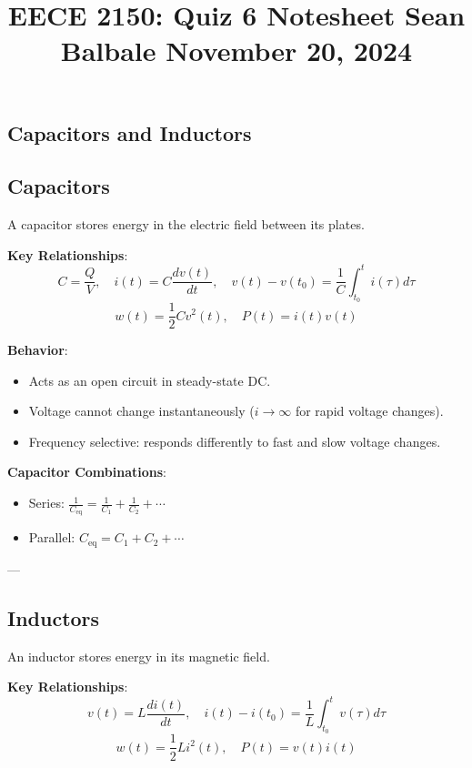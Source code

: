 \documentclass[9pt]{article}
\title{
    \vspace{-2em}
    \large EECE 2150: Quiz 6 Notesheet \hfill Sean Balbale \hfill November 20, 2024
    \vspace{-4em}
}
\date{}
\begin{document}
\maketitle

\begin{multicols}{2}

\section{Capacitors and Inductors}

\subsection{Capacitors}
A capacitor stores energy in the electric field between its plates.

\textbf{Key Relationships}:
\[
C = \frac{Q}{V}, \quad i(t) = C \frac{dv(t)}{dt}, \quad v(t) - v(t_0) = \frac{1}{C} \int_{t_0}^t i(\tau) d\tau
\]
\[
w(t) = \frac{1}{2} C v^2(t), \quad P(t) = i(t)v(t)
\]

\textbf{Behavior}:
\begin{itemize}\itemsep0pt
    \item Acts as an open circuit in steady-state DC.
    \item Voltage cannot change instantaneously (\(i \to \infty\) for rapid voltage changes).
    \item Frequency selective: responds differently to fast and slow voltage changes.
\end{itemize}

\textbf{Capacitor Combinations}:
\begin{itemize}\itemsep0pt
    \item Series: \( \frac{1}{C_{\text{eq}}} = \frac{1}{C_1} + \frac{1}{C_2} + \cdots \)
    \item Parallel: \( C_{\text{eq}} = C_1 + C_2 + \cdots \)
\end{itemize}

---

\subsection{Inductors}
An inductor stores energy in its magnetic field.

\textbf{Key Relationships}:
\[
v(t) = L \frac{di(t)}{dt}, \quad i(t) - i(t_0) = \frac{1}{L} \int_{t_0}^t v(\tau) d\tau
\]
\[
w(t) = \frac{1}{2} L i^2(t), \quad P(t) = v(t)i(t)
\]


\end{multicols}
\end{document}
